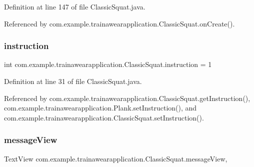 Definition at line 147 of file Classic\+Squat.\+java.



Referenced by com.\+example.\+trainawearapplication.\+Classic\+Squat.\+on\+Create().

\mbox{\label{classcom_1_1example_1_1trainawearapplication_1_1_classic_squat_a3cbf1db0a5560d931ebdaa407a1a6285}} 
\subsubsection{\texorpdfstring{instruction}{instruction}}
{\footnotesize\ttfamily int com.\+example.\+trainawearapplication.\+Classic\+Squat.\+instruction = 1\hspace{0.3cm}{\ttfamily [static]}}



Definition at line 31 of file Classic\+Squat.\+java.



Referenced by com.\+example.\+trainawearapplication.\+Classic\+Squat.\+get\+Instruction(), com.\+example.\+trainawearapplication.\+Plank.\+set\+Instruction(), and com.\+example.\+trainawearapplication.\+Classic\+Squat.\+set\+Instruction().

\mbox{\label{classcom_1_1example_1_1trainawearapplication_1_1_classic_squat_a7a13bea1e66bb87427aa5974ebae838e}} 
\subsubsection{\texorpdfstring{messageView}{messageView}}
{\footnotesize\ttfamily Text\+View com.\+example.\+trainawearapplication.\+Classic\+Squat.\+message\+View\hspace{0.3cm}{\ttfamily [static]}, {\ttfamily [package]}}



